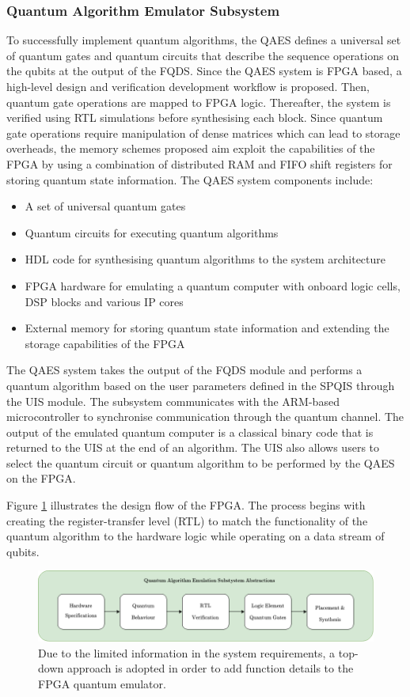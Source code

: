 \subsubsection{Quantum Algorithm Emulator Subsystem}

To successfully implement quantum algorithms, the QAES defines a universal set of quantum gates and quantum circuits that describe the sequence operations on the qubits at the output of the FQDS. Since the QAES system is FPGA based, a high-level design and verification development workflow is proposed. Then, quantum gate operations are mapped to FPGA logic. Thereafter, the system is verified using RTL simulations before synthesising each block. Since quantum gate operations require manipulation of dense matrices which can lead to storage overheads, the memory schemes proposed aim exploit the capabilities of the FPGA by using a combination of distributed RAM and FIFO shift registers for storing quantum state information. The QAES system components include:
\begin{itemize}
	\item 
	A set of universal quantum gates
	\item 
	Quantum circuits for executing quantum algorithms
	\item 
	HDL code for synthesising quantum algorithms to the system architecture
	\item 
	FPGA hardware for emulating a quantum computer with onboard logic cells, DSP blocks and various IP cores
	\item 
	External memory for storing quantum state information and extending the storage capabilities of the FPGA	
\end{itemize}
The QAES system takes the output of the FQDS module and performs a quantum algorithm based on the user parameters defined in the SPQIS through the UIS module. The subsystem communicates with the ARM-based microcontroller to synchronise communication through the quantum channel. The output of the emulated quantum computer is a classical binary code that is returned to the UIS at the end of an algorithm. The UIS also allows users to select the quantum circuit or quantum algorithm to be performed by the QAES on the FPGA. 

Figure \ref{fig:fpga-design-flow} illustrates the design flow of the FPGA. The process begins with creating the register-transfer level (RTL) to match the functionality of the quantum algorithm to the hardware logic while operating on a data stream of qubits. 
\begin{figure}[!ht]
	\centering
	\includegraphics[width=1.0\linewidth]{body/ch4/figs/fpga-design-flow}
	\caption[Design Abstraction of FPGA-Based Quantum Computer Emulator.]{Due to the limited information in the system requirements, a top-down approach is adopted in order to add function details to the FPGA quantum emulator.}
	\label{fig:fpga-design-flow}
\end{figure}

